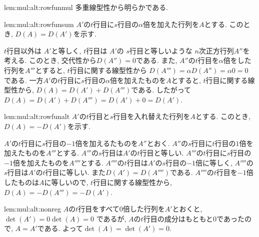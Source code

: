 \begin{proofof*}{lem:mul:alt:rowfun}{mul}
  多重線型性から明らかである.
\end{proofof*}
\begin{proofof*}{lem:mul:alt:rowfun}{sum}
  $A'$の$t$行目に$s$行目の$\alpha$倍を加えた行列を$A$とする.
  このとき, 
  $D(A)=D(A')$を示す.
  
  $t$行目以外は
  $A'$と等しく,
  $t$行目は
  $A'$の
  $s$行目と等しいような
  $n$次正方行列$A''$を考える.
  このとき, 交代性から$D(A'')=0$である.
  また, $A''$の$t$行目を$\alpha$倍をした行列を$A'''$とすると,
  $t$行目に関する線型性から
  $D(A''')=\alpha D(A'')=\alpha 0=0$
  である.
  一方$A'$の$t$行目に$s$行目の$\alpha$倍を加えたものを$A$とすると,
  $t$行目に関する線型性から,
  $D(A)=D(A')+D(A''')$である.
  したがって$D(A)=D(A')+D(A''')=D(A')+0=D(A')$.
\end{proofof*}
\begin{proofof*}{lem:mul:alt:rowfun}{alt}
  $A'$の$t$行目と$s$行目を入れ替えた行列を$A$とする.
  このとき, 
  $D(A)=-D(A')$を示す.

  $A'$の$t$行目に$s$行目の$-1$倍を加えるたものを$A''$とおく.
  $A''$の$s$行目に$t$行目の$1$倍を加えたものを$A'''$とする.
  $A'''$の$s$行目は$A'$の$t$行目と等しい.
  $A'''$の$t$行目に$s$行目の$-1$倍を加えたものを$A''''$とする.
  $A''''$の$t$行目は$A'$の$s$行目の$-1$倍に等しく,
  $A''''$の$s$行目は$A'$の$t$行目に等しい.
  また$D(A')=D(A'''')$である.
  $A''''$の$t$行目を$-1$倍したものは$A$に等しいので,
  $t$行目に関する線型性から,
  $D(A)=-D(A''')=-D(A')$.
\end{proofof*}

\begin{proofof}{lem:mul:alt:nonreg}
  $A$の$t$行目をすべて$0$倍した行列を$A'$とおくと,
  $\det(A')=0\det(A)=0$
  であるが,
  $A$の$t$行目の成分はもともと$0$であったので, $A=A'$である.
  よって$\det(A)=\det(A')=0$.
\end{proofof}



\endinput

\section{逆行列や正則に関する命題の証明}
ここでは, \Cref{chap:inverse}に現れる命題の証明を行う.
逆行列や正則行列に関する命題については,
一般の正方行列の場合について証明をしているので,
煩雑になっている部分がある.
$2$-次正方行列の場合のみについて証明をするのであれば,
直接計算をすることで示すほうが手っ取り早いものが多い.
行列式に関する命題は,
行列式を$2$次正方行列にしかここでは定義していないこともあり,
$2$-次正方行列の場合のみについて証明をしている.





